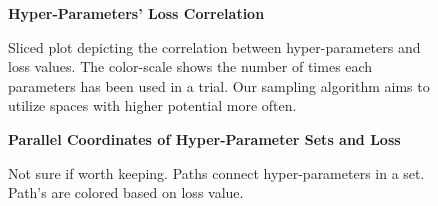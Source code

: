 \documentclass[\main/thesis.tex]{subfiles}
\begin{document}
\begin{figure}[t]
\begin{center}
    \textbf{Hyper-Parameters' Loss Correlation}
      \caption{Sliced plot depicting the correlation between hyper-parameters and loss values. The color-scale shows the number of times each parameters has been used in a trial. Our sampling algorithm aims to utilize spaces with higher potential more often. }
    \label{fig:slicegraph}
    \end{center}

\end{figure}
\begin{figure}[h!]
\begin{center}
    \textbf{ Parallel Coordinates of Hyper-Parameter Sets and Loss}
      \caption{Not sure if worth keeping. Paths connect hyper-parameters in a set. Path's are colored based on loss value.}
       \label{fig:parallel_coord}
    \end{center}
   
\end{figure}
\end{document}

